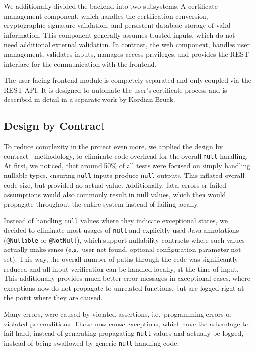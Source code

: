 We additionally divided the backend into two subsystems.
A certificate management component, which handles the certification conversion, cryptographic signature validation, and
persistent database storage of valid information.
This component generally assumes trusted inputs, which do not need additional external validation.
In contrast, the web component, handles user management, validates inputs, manages access privileges, and provides the
REST interface for the communication with the frontend.

The user-facing frontend module is completely separated and only coupled via the REST API\@.
It is designed to automate the user's certificate process and is described in detail in a separate work by Kordian
Bruck.


\subsection*{Design by Contract}
To reduce complexity in the project even more, we applied the design by contract~\cite{meyer1992applying} methodology,
to eliminate code overhead for the overall \lstinline{null} handling.
At first, we noticed, that around 50\% of all tests were focused on simply handling nullable types, ensuring
\lstinline{null} inputs produce \lstinline{null} outputs.
This inflated overall code size, but provided no actual value.
Additionally, fatal errors or failed assumptions would also commonly result in null values, which then would propagate
throughout the entire system instead of failing locally.

Instead of handling \lstinline{null} values where they indicate exceptional states, we decided to eliminate most usages
of \lstinline{null} and explicitly used Java annotations (\lstinline{@Nullable} or \lstinline{@NotNull}), which support
nullability contracts where such values actually make sense (e.g.\ user not found, optional configuration parameter not
set).
This way, the overall number of paths through the code was significantly reduced and all input verification can be
handled locally, at the time of input.
This additionally provides much better error messages in exceptional cases, where exceptions now do not propagate to
unrelated functions, but are logged right at the point where they are caused.

Many errors, were caused by violated assertions, i.e.\ programming errors or violated preconditions.
Those now cause exceptions, which have the advantage to fail hard, instead of generating propagating \lstinline{null}
values and actually be logged,
instead of being swallowed by generic \lstinline{null} handling code.

